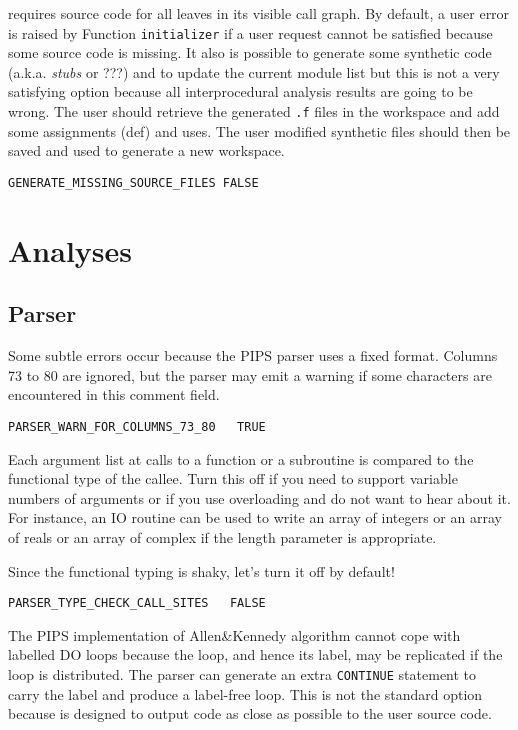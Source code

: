 \PIPS{} requires source code for all leaves in its visible call graph. By
default, a user error is raised by Function \verb/initializer/ if a user
request cannot be satisfied because some source code is missing. It also
is possible to generate some synthetic code (a.k.a. {\em stubs} or ???)
and to update the current module list but this is not a very satisfying
option because all interprocedural analysis results are going to be wrong.
The user should retrieve the generated \verb/.f/ files in the workspace
and add some assignments (def) and uses. The user modified synthetic files
should then be saved and used to generate a new workspace.

\begin{verbatim}
GENERATE_MISSING_SOURCE_FILES FALSE
\end{verbatim}




\section{Analyses}
\label{section-analyses}

\subsection{Parser}

Some subtle errors occur because the PIPS parser uses a fixed
format. Columns 73 to 80 are ignored, but the parser may emit a warning
if some characters are encountered in this comment field.

\begin{verbatim}
PARSER_WARN_FOR_COLUMNS_73_80   TRUE
\end{verbatim}

Each argument list at calls to a function or a subroutine is compared to
the functional type of the callee. Turn this off if you need to support
variable numbers of arguments or if you use overloading and do not want to
hear about it. For instance, an IO routine can be used to write an array
of integers or an array of reals or an array of complex if the length
parameter is appropriate.

Since the functional typing is shaky, let's turn it off by default!

\begin{verbatim}
PARSER_TYPE_CHECK_CALL_SITES   FALSE
\end{verbatim}

The PIPS implementation of Allen\&Kennedy algorithm cannot cope with
labelled DO loops because the loop, and hence its label, may be
replicated if the loop is distributed. The parser can generate an extra
\verb/CONTINUE/ statement to carry the label and produce a label-free
loop. This is not the standard option because \PIPS{} is designed to
output code as close as possible to the user source code.

